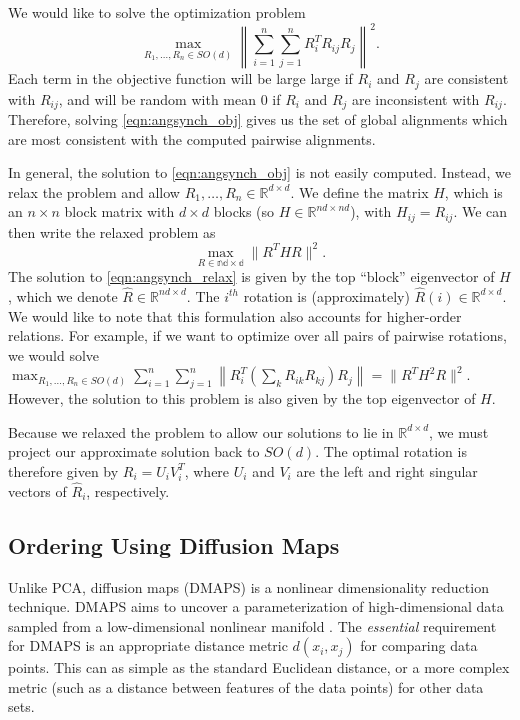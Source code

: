 \documentclass[12pt]{article}
\begin{document}
We would like to solve the optimization problem 
\begin{equation} \label{eqn:angsynch_obj}
\max_{R_1, \dots, R_n \in SO(d)} \left\| \sum_{i=1}^{n} \sum_{j=1}^{n} R_i^T R_{ij} R_j \right\|^2.
\end{equation}
%
Each term in the objective function will be large large if $R_i$ and $R_j$ are consistent with $R_{ij}$, and will be random with mean 0 if $R_i$ and $R_j$ are inconsistent with $R_{ij}$.
%
Therefore, solving \eqref{eqn:angsynch_obj} gives us the set of global alignments which are most consistent with the computed pairwise alignments.

In general, the solution to \eqref{eqn:angsynch_obj} is not easily computed.
%
Instead, we relax the problem and allow $R_1, \dots, R_n \in \mathbb{R}^{d \times d}$.
%
We define the matrix $H$, which is an $n \times n$ block matrix with $d \times d$ blocks (so $H \in \mathbb{R}^{nd \times nd}$), with $H_{ij} = R_{ij}$.
%
We can then write the relaxed problem as 
\begin{equation} \label{eqn:angsynch_relax}
\max_{R\in \mathbb{nd \times d}} \| R^T H R \|^2.
\end{equation}
%
The solution to \eqref{eqn:angsynch_relax} is given by the top ``block'' eigenvector of $H$, which we denote $\hat{R} \in \mathbb{R}^{nd \times d}$. 
%
The $i^{th}$ rotation is (approximately) $\hat{R}(i) \in \mathbb{R}^{d \times d}$.
%
We would like to note that this formulation also accounts for higher-order relations.
%
For example, if we want to optimize over all pairs of pairwise rotations, we would solve $\max_{R_1, \dots, R_n \in SO(d)} \sum_{i=1}^{n} \sum_{j=1}^{n} \left\| R_i^T \left( \sum_k R_{ik} R_{kj} \right) R_j \right\| = \| R^T H^2 R \|^2$. 
%
However, the solution to this problem is also given by the top eigenvector of $H$. 

Because we relaxed the problem to allow our solutions to lie in $\mathbb{R}^{d \times d}$, we must project our approximate solution back to $SO(d)$.
%
The optimal rotation is therefore given by $R_i = U_i V_i^T$, where $U_i$ and $V_i$ are the left and right singular vectors of $\hat{R}_i$, respectively. 



\subsection{Ordering Using Diffusion Maps}

Unlike PCA, diffusion maps (DMAPS) is a nonlinear dimensionality reduction technique. 
%
DMAPS aims to uncover a parameterization of high-dimensional data sampled from a low-dimensional nonlinear manifold \cite{coifman2005geometric}.
%
The {\em essential} requirement for DMAPS is an appropriate distance metric $d(x_i, x_j)$ for comparing data points. 
%
This can as simple as the standard Euclidean distance, or a more complex metric (such as a distance between features of the data points) for other data sets.
\end{document}
